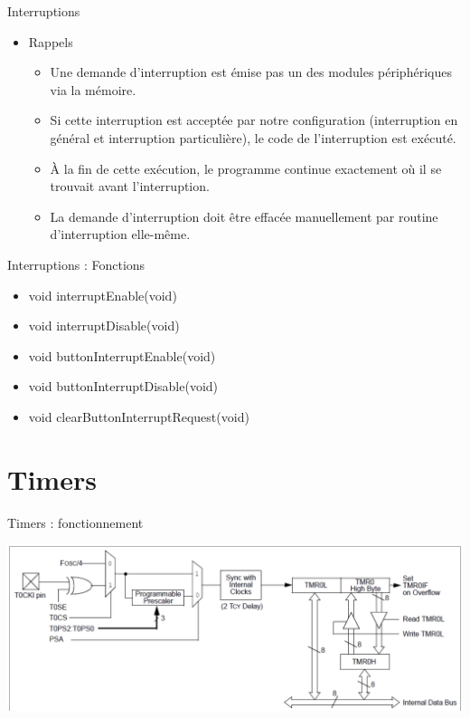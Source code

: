 \begin{frame}{Interruptions}

\begin{itemize}
\itemsep1pt\parskip0pt
\item
  Rappels

  \begin{itemize}
  \itemsep1pt\parskip0pt
  \item
    Une demande d'interruption est émise pas un des modules
    périphériques via la mémoire.
  \item
    Si cette interruption est acceptée par notre configuration
    (interruption en général et interruption particulière), le code de
    l'interruption est exécuté.
  \item
    À la fin de cette exécution, le programme continue exactement où il
    se trouvait avant l'interruption.
  \item
    La demande d'interruption doit être effacée manuellement par routine
    d'interruption elle-même.
  \end{itemize}
\end{itemize}

\end{frame}

\begin{frame}{Interruptions : Fonctions}

\begin{itemize}
\itemsep1pt\parskip0pt
\item
  void interruptEnable(void)
\item
  void interruptDisable(void)
\item
  void buttonInterruptEnable(void)
\item
  void buttonInterruptDisable(void)
\item
  void clearButtonInterruptRequest(void)
\end{itemize}

\end{frame}

\section{Timers}\label{timers}

\begin{frame}{Timers : fonctionnement}

\begin{center}
\includegraphics[width=1\textwidth]{images/tmr0.png}
\end{center}

\end{frame}

